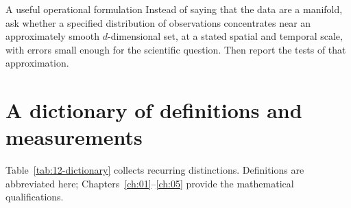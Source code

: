 \begin{insight}{A useful operational formulation}
Instead of saying that the data are a manifold, ask whether a specified distribution of observations concentrates near an approximately smooth \(d\)-dimensional set, at a stated spatial and temporal scale, with errors small enough for the scientific question. Then report the tests of that approximation.
\end{insight}

\section{A dictionary of definitions and measurements}
Table~\ref{tab:12-dictionary} collects recurring distinctions. Definitions are abbreviated here; Chapters~\ref{ch:01}--\ref{ch:05} provide the mathematical qualifications.

